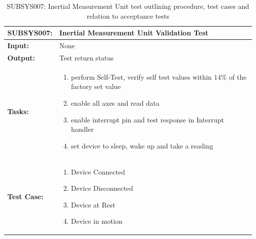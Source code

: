 \begin{table}[H]
    \centering
    \caption{SUBSYS007: Inertial Measurement Unit test outlining procedure, test cases and relation to acceptance tests}
    \begin{tabular}{|m{}|m{}|}
    \hline
       \textbf{SUBSYS007: }  &  Inertial Measurement Unit Validation Test\\
       \hline
        \textbf{Input: } &  None\\
        \hline
        \textbf{Output: } & Test return status \\
        \hline
        \textbf{Tasks: } & \begin{enumerate}
        \vspace{1mm}
            \item perform Self-Test, verify self test values within $14\%$ of the factory set value
            \item enable all axes and read data
            \item enable interrupt pin and test response in Interrupt handler
            \item set device to sleep, wake up and take a reading
        \end{enumerate}\\
        \hline
        \textbf{Test Case: } & \begin{enumerate}
            \vspace{1mm}
                \item Device Connected 
                \item Device Disconnected
                \item Device at Rest
                \item Device in motion
        \end{enumerate}\\
        \hline
    \end{tabular}
    \label{tab:SUBSYS007}
\end{table}


